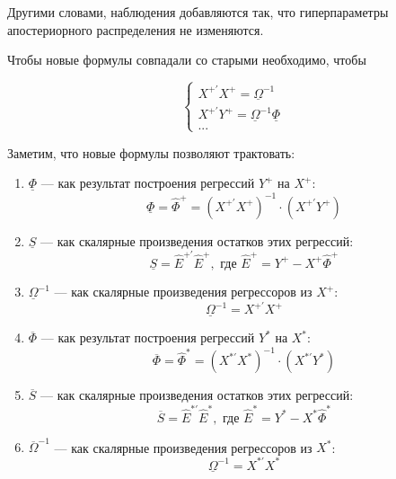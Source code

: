 \documentclass[11pt]{article} %
\newcommand{\prior}{\underline}
\newcommand{\post}{\overline}
\let\vec\relax
\DeclareMathOperator{\vec}{vec}
\begin{document}

Другими словами, наблюдения добавляются так, что гиперпараметры апостериорного распределения не изменяются. 

Чтобы новые формулы совпадали со старыми необходимо, чтобы

\begin{equation}
\begin{cases}
X^{+\prime}X^+=\prior \Omega^{-1} \\
X^{+\prime}Y^+=\prior \Omega^{-1}\prior \Phi \\
...
\end{cases}
\end{equation}







Заметим, что новые формулы позволяют трактовать:
\begin{enumerate}
\item $\prior \Phi$ --- как результат построения регрессий $Y^+$ на $X^+$:
\[
\prior \Phi= \hat \Phi^+ = (X^{+\prime}X^+)^{-1}\cdot (X^{+\prime}Y^+)
\]
\item $\prior S$ --- как скалярные произведения остатков этих регрессий:
\[
\prior S = \hat E^{+\prime} \hat E^+, \text{ где } \hat E^+=Y^+-X^+\hat \Phi^+
\]
\item $\prior \Omega^{-1}$ --- как скалярные произведения регрессоров из $X^+$:
\[
\prior \Omega^{-1}=X^{+\prime}X^+
\]
\item $\post \Phi$ --- как результат построения регрессий $Y^*$ на $X^*$:
\[
\post \Phi= \hat \Phi^* = (X^{*\prime}X^*)^{-1}\cdot (X^{*\prime}Y^*)
\]
\item $\post S$ --- как скалярные произведения остатков этих регрессий:
\[
\post S = \hat E^{*\prime} \hat E^*, \text{ где } \hat E^*=Y^*-X^*\hat \Phi^*
\]
\item $\post \Omega^{-1}$ --- как скалярные произведения регрессоров из $X^*$:
\[
\prior \Omega^{-1}=X^{*\prime}X^*
\]
\end{enumerate}
\end{document}
